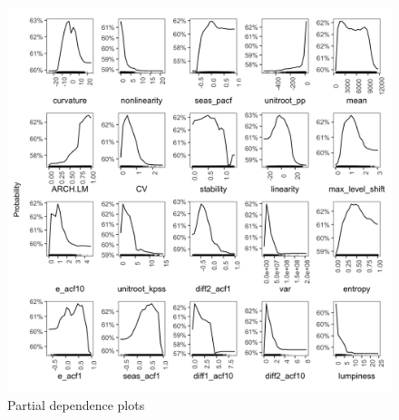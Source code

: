\documentclass[]{elsarticle} %
\begin{document}
\begin{figure}[H]

{\centering \includegraphics[width=1\linewidth]{img/300dpi/pfinal} 

}

\caption{Partial dependence plots}\label{fig:pdpcommon1}
\end{figure}
\end{document}
